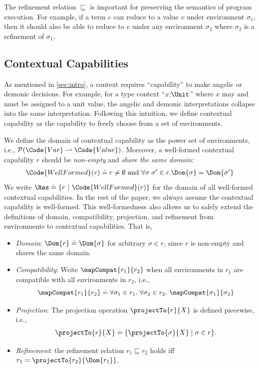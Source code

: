 The refinement relation $\sqsubseteq$ is important for preserving the semantics of program execution. For example, if a term $e$ can reduce to a value $v$ under environment $\sigma_1$, then it should also be able to reduce to $v$ under any environment $\sigma_2$ where $\sigma_2$ is a refinement of $\sigma_1$.

\subsection{Contextual Capabilities}

As mentioned in \autoref{sec:intro}, a context requires ``capability'' to make angelic or demonic decisions. For example, for a type context ``$x{:}\Unit$'' where $x$ may and must be assigned to a unit value, the angelic and demonic interpretations collapse into the same interpretation. Following this intuition, we define contextual capability as the capability to freely choose from a set of environments.

\begin{definition}\label{def:contextual-capability}
We define the domain of contextual capability as the power set of environments, i.e., $\mathcal{P}(\Code{Var} \rightharpoonup \Code{Value})$. Moreover, a well-formed contextual capability $r$ should be \emph{non-empty} and \emph{share the same domain}:
\begin{align*}
  \Code{WellFormed}(r) \doteq r \not= \emptyset \text{ and } \forall \sigma\;\sigma' \in r. \Dom{\sigma} = \Dom{\sigma'}
\end{align*}\noindent
We write $\Res \doteq \{r ~|~ \Code{WellFormed}(r) \}$ for the domain of all well-formed contextual capabilities.
In the rest of the paper, we always assume the contextual capability is well-formed.
This well-formedness also allows us to safely extend the definitions of domain, compatibility, projection, and refinement from environments to contextual capabilities. That is,
\begin{itemize}
  \item \emph{Domain}: $\Dom{r} \doteq \Dom{\sigma}$ for arbitrary $\sigma \in r$, since $r$ is non-empty and shares the same domain.
  \item \emph{Compatibility}: Write $\mapCompat{r_1}{r_2}$ when all environments in $r_1$ are compatible with all environments in $r_2$, i.e.,
    \[
      \mapCompat{r_1}{r_2}
      \doteq
      \forall \sigma_1 \in r_1.\;\forall \sigma_2 \in r_2.\; \mapCompat{\sigma_1}{\sigma_2}
    \]
  \item \emph{Projection}: The projection operation $\projectTo{r}{X}$ is defined piecewise, i.e.,
  \begin{align*}
    \projectTo{r}{X} \doteq \{ \projectTo{\sigma}{X} \mid \sigma \in r \}.
  \end{align*}
  \item \emph{Refinement}: the refinement relation $r_1 \sqsubseteq r_2$ holds iff $r_1 = \projectTo{r_2}{\Dom{r_1}} $.
\end{itemize}
\end{definition}

